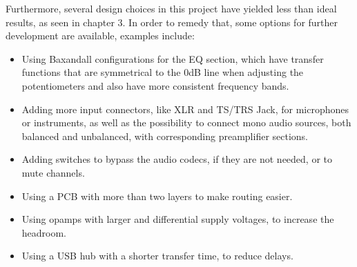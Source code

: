 Furthermore, several design choices in this project have yielded less than
ideal results, as seen in chapter 3.
In order to remedy that, some options for further development are available,
examples include:

\begin{itemize}
    \item Using Baxandall configurations for the EQ section, which
        have transfer functions that are symmetrical to the 0dB line when
        adjusting the potentiometers and also have more consistent frequency
        bands.
    \item Adding more input connectors, like XLR and TS/TRS Jack,
        for microphones or instruments, as well as the possibility to connect
        mono audio sources, both balanced and unbalanced, with corresponding
        preamplifier sections.
    \item Adding switches to bypass the audio codecs, if they are not needed,
        or to mute channels.
    \item Using a PCB with more than two layers to make routing easier.
    \item Using opamps with larger and differential supply voltages, to
        increase the headroom.
    \item Using a USB hub with a shorter transfer time, to reduce delays.
\end{itemize}


\printbibliography
{}


